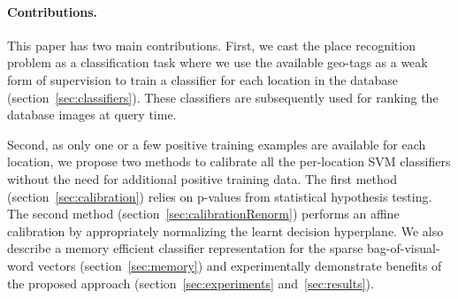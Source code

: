 \paragraph{Contributions.} 
  This paper has two main contributions. 
  First, we cast the place recognition problem as a classification task where we use the available geo-tags as a weak form of supervision to train a classifier for each location in the database (section~\ref{sec:classifiers}).
  These classifiers are subsequently used for ranking the database images at query time.

  Second, as only 
  \textcolor{petr}{one or} 
  a few positive training examples are available for each location, we propose two methods to calibrate all the per-location SVM classifiers without the need for additional positive training data. The first method (section~\ref{sec:calibration}) relies on p-values from statistical hypothesis testing. The second method (section~\ref{sec:calibrationRenorm}) performs an affine calibration by appropriately normalizing the learnt decision hyperplane. We also describe a memory efficient classifier representation for the sparse bag-of-visual-word vectors (section~\ref{sec:memory}) and  experimentally demonstrate benefits of the proposed approach (section~\ref{sec:experiments} and~\ref{sec:results}).  


